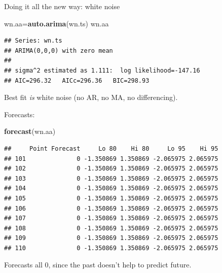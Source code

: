 \documentclass[ignorenonframetext,]{beamer}
\newenvironment{Shaded}{\begin{snugshade}}{\end{snugshade}}
\newcommand{\KeywordTok}[1]{\textcolor[rgb]{0.13,0.29,0.53}{\textbf{#1}}}
\newcommand{\NormalTok}[1]{#1}
\begin{document}
\begin{frame}[fragile]{Doing it all the new way: white noise}
\protect\hypertarget{doing-it-all-the-new-way-white-noise}{}

\begin{Shaded}
\begin{Highlighting}[]
\NormalTok{wn.aa=}\KeywordTok{auto.arima}\NormalTok{(wn.ts)}
\NormalTok{wn.aa}
\end{Highlighting}
\end{Shaded}

\begin{verbatim}
## Series: wn.ts 
## ARIMA(0,0,0) with zero mean 
## 
## sigma^2 estimated as 1.111:  log likelihood=-147.16
## AIC=296.32   AICc=296.36   BIC=298.93
\end{verbatim}

Best fit \emph{is} white noise (no AR, no MA, no differencing).

\end{frame}

\begin{frame}[fragile]{Forecasts:}
\protect\hypertarget{forecasts}{}

\small

\begin{Shaded}
\begin{Highlighting}[]
\KeywordTok{forecast}\NormalTok{(wn.aa)}
\end{Highlighting}
\end{Shaded}

\begin{verbatim}
##     Point Forecast     Lo 80    Hi 80     Lo 95    Hi 95
## 101              0 -1.350869 1.350869 -2.065975 2.065975
## 102              0 -1.350869 1.350869 -2.065975 2.065975
## 103              0 -1.350869 1.350869 -2.065975 2.065975
## 104              0 -1.350869 1.350869 -2.065975 2.065975
## 105              0 -1.350869 1.350869 -2.065975 2.065975
## 106              0 -1.350869 1.350869 -2.065975 2.065975
## 107              0 -1.350869 1.350869 -2.065975 2.065975
## 108              0 -1.350869 1.350869 -2.065975 2.065975
## 109              0 -1.350869 1.350869 -2.065975 2.065975
## 110              0 -1.350869 1.350869 -2.065975 2.065975
\end{verbatim}

\normalsize

Forecasts all 0, since the past doesn't help to predict future.

\end{frame}
\end{document}
